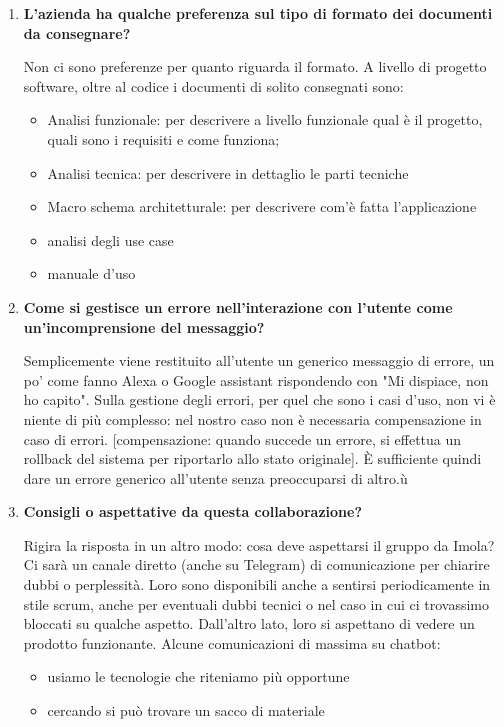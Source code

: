\documentclass[11pt]{article}
\begin{document}
\begin{enumerate}
			\bigskip 
			
			\item \textbf{L'azienda ha qualche preferenza sul tipo di formato dei documenti da consegnare?}
			
			\medskip
			
			Non ci sono preferenze per quanto riguarda il formato. A livello di progetto software, oltre al codice i documenti di solito consegnati sono:
			\begin{itemize}
				\item Analisi funzionale: per descrivere a livello funzionale qual è il progetto, quali sono i requisiti e come funziona;
				\item Analisi tecnica: per descrivere in dettaglio le parti tecniche 
				\item Macro schema architetturale: per descrivere com'è fatta l'applicazione 
				\item analisi degli use case
				\item manuale d'uso
			\end{itemize}
			
			\bigskip 
			
			\item \textbf{Come si gestisce un errore nell'interazione con l'utente come un'incomprensione del messaggio?}
			
			\medskip
			
			Semplicemente viene restituito all'utente un generico messaggio di errore, un po' come fanno Alexa o Google assistant rispondendo con "Mi dispiace, non ho capito". Sulla gestione degli errori, per quel che sono i casi d'uso, non vi è niente di più complesso: nel nostro caso non è necessaria compensazione in caso di errori. [compensazione: quando succede un errore, si effettua un rollback del sistema per riportarlo allo stato originale]. È sufficiente quindi dare un errore generico all'utente senza preoccuparsi di altro.ù
			
			
			\bigskip 
			
			\item \textbf{Consigli o aspettative da questa collaborazione?}
			
			\medskip
			
			Rigira la risposta in un altro modo: cosa deve aspettarsi il gruppo da Imola?
			Ci sarà un canale diretto (anche su Telegram) di comunicazione per chiarire dubbi o perplessità. Loro sono disponibili anche a sentirsi periodicamente in stile scrum, anche per eventuali dubbi tecnici o nel caso in cui ci trovassimo bloccati su qualche aspetto. Dall'altro lato, loro si aspettano di vedere un prodotto funzionante.
			Alcune comunicazioni di massima su chatbot:
			\begin{itemize}
				\item usiamo le tecnologie che riteniamo più opportune
				\item cercando si può trovare un sacco di materiale 
			\end{itemize}
		\end{enumerate}
\end{document}
